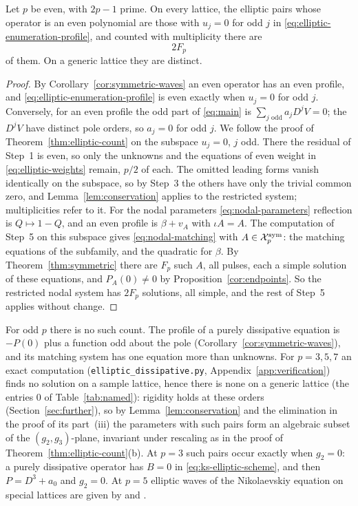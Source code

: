 \begin{corollary}
\label{cor:elliptic-symmetric}
Let \(p\) be even, with \(2p-1\) prime. On every lattice, the elliptic
pairs whose operator is an even polynomial are those with \(u_j=0\) for
odd \(j\) in \eqref{eq:elliptic-enumeration-profile}, and counted with
multiplicity there are
\begin{equation}\label{eq:elliptic-symmetric-length}
 2F_p
\end{equation}
of them. On a generic lattice they are distinct.
\end{corollary}

\begin{proof}
By Corollary~\ref{cor:symmetric-waves} an even operator has an even
profile, and \eqref{eq:elliptic-enumeration-profile} is even exactly
when \(u_j=0\) for odd \(j\). Conversely, for an even profile the odd
part of \eqref{eq:main} is \(\sum_{j\text{ odd}}a_jD^jV=0\); the
\(D^jV\) have distinct pole orders, so \(a_j=0\) for odd \(j\). We
follow the proof of Theorem~\ref{thm:elliptic-count} on the subspace
\(u_j=0\), \(j\) odd. There the residual of Step~1 is even, so only the
unknowns and the equations of even weight in \eqref{eq:elliptic-weights}
remain, \(p/2\) of each. The omitted leading forms vanish identically on
the subspace, so by Step~3 the others have only the trivial common zero,
and Lemma~\ref{lem:conservation} applies to the restricted system;
multiplicities refer to it. For the nodal parameters
\eqref{eq:nodal-parameters} reflection is \(Q\mapsto1-Q\), and an even
profile is \(\beta+v_A\) with \(\iota A=A\). The computation of Step~5
on this subspace gives \eqref{eq:nodal-matching} with
\(A\in\mathcal X_p^{\mathrm{sym}}\): the matching equations of the subfamily, and
the quadratic for \(\beta\). By Theorem~\ref{thm:symmetric} there are
\(F_p\) such \(A\), all pulses, each a simple solution of these
equations, and \(P_A(0)\ne0\) by Proposition~\ref{cor:endpoints}. So the
restricted nodal system has \(2F_p\) solutions, all simple, and the rest
of Step~5 applies without change.
\end{proof}

For odd \(p\) there is no such count. The profile of a purely
dissipative equation is \(-P(0)\) plus a function odd about the pole
(Corollary~\ref{cor:symmetric-waves}), and its matching system has one
equation more than unknowns. For \(p=3,5,7\) an exact computation
(\texttt{elliptic\_dissipative.py}, Appendix~\ref{app:verification})
finds no solution on a sample lattice, hence there is none on a generic
lattice (the entries \(0\) of Table~\ref{tab:named}): rigidity holds at
these orders (Section~\ref{sec:further}), so by
Lemma~\ref{lem:conservation} and the elimination in the proof of its
part~(iii) the parameters with such pairs form an algebraic subset of
the \((g_2,g_3)\)-plane, invariant under rescaling as in the proof of
Theorem~\ref{thm:elliptic-count}(b). At \(p=3\) such pairs occur exactly
when \(g_2=0\): a purely dissipative operator has \(B=0\) in
\eqref{eq:ks-elliptic-scheme}, and then \(P=D^3+a_0\) and \(g_2=0\). At
\(p=5\) elliptic waves of the Nikolaevskiy equation on special lattices
are given by \citet{Kudryashov2004} and \citet{KudryashovDemina2007}.
